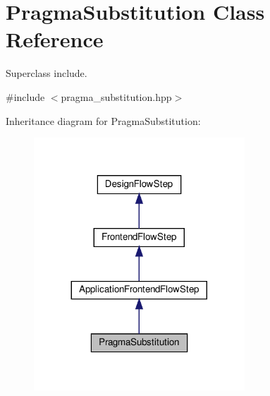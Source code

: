 \hypertarget{classPragmaSubstitution}{}\section{Pragma\+Substitution Class Reference}
\label{classPragmaSubstitution}


Superclass include.  




{\ttfamily \#include $<$pragma\+\_\+substitution.\+hpp$>$}



Inheritance diagram for Pragma\+Substitution\+:
\nopagebreak
\begin{figure}[H]
\begin{center}
\leavevmode
\includegraphics[width=224pt]{d3/ddd/classPragmaSubstitution__inherit__graph}
\end{center}
\end{figure}



